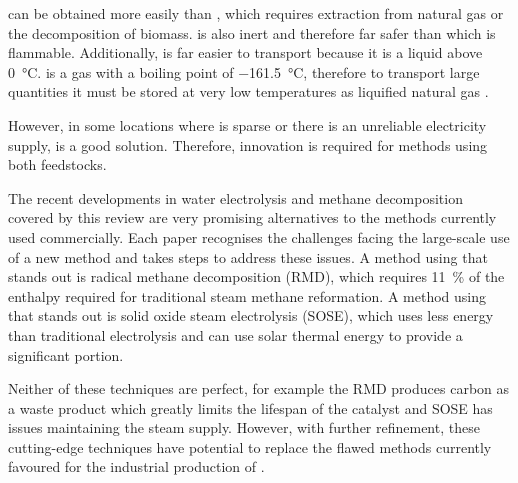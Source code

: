   can be obtained more easily than  , which requires extraction from natural gas or the decomposition of biomass.
  is also inert and therefore far safer than   which is flammable.
Additionally,   is far easier to transport because it is a liquid above \SI{0}{\celsius}.
 is a gas with a boiling point of \SI{-161.5}{\celsius}, therefore to transport large quantities it must be stored at very low temperatures as liquified natural gas \cite{lngamerica}.

However, in some locations where   is sparse or there is an unreliable electricity supply,   is a good solution\cite{SBN2020}.
Therefore, innovation is required for methods using both feedstocks.

The recent developments in water electrolysis and methane decomposition covered by this review are very promising alternatives to the methods currently used commercially.
Each paper recognises the challenges facing the large-scale use of a new method and takes steps to address these issues.
A method using   that stands out is radical methane decomposition (RMD), which requires \SI{11}{\percent} of the enthalpy required for traditional steam methane reformation.
A method using   that stands out is solid oxide steam electrolysis (SOSE), which uses less energy than traditional electrolysis and can use solar thermal energy to provide a significant portion.

Neither of these techniques are perfect, for example the RMD produces carbon as a waste product which greatly limits the lifespan of the catalyst and SOSE has issues maintaining the steam supply.
However, with further refinement, these cutting-edge techniques have potential to replace the flawed methods currently favoured for the industrial production of  .
